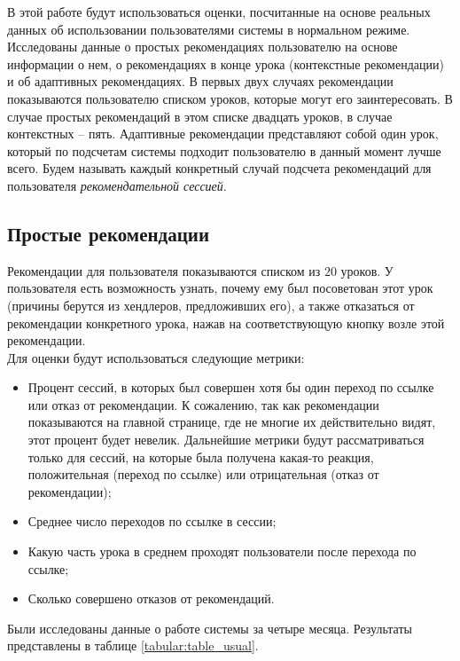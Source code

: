 \documentclass[14pt]{matmex-diploma}
\begin{document}
\indent В этой работе будут использоваться оценки, посчитанные на основе реальных данных об использовании пользователями системы в нормальном режиме. Исследованы данные о простых рекомендациях пользователю на основе информации о нем, о рекомендациях в конце урока (контекстные рекомендации) и об адаптивных рекомендациях. 
\indent В первых двух случаях рекомендации показываются пользователю списком уроков, которые могут его заинтересовать. В случае простых рекомендаций в этом списке двадцать уроков, в случае контекстных -- пять. Адаптивные рекомендации представляют собой один урок, который по подсчетам системы подходит пользователю в данный момент лучше всего. Будем называть каждый конкретный случай подсчета рекомендаций для пользователя \textit{рекомендательной сессией}.

\subsection{Простые рекомендации}
\indent Рекомендации для пользователя показываются списком из $20$ уроков. У пользователя есть возможность узнать, почему ему был посоветован этот урок (причины берутся из хендлеров, предложивших его), а также отказаться от рекомендации конкретного урока, нажав на соответствующую кнопку возле этой рекомендации. 
\\\indent Для оценки будут использоваться следующие метрики:

\begin{itemize}
    \item Процент сессий, в которых был совершен хотя бы один переход по ссылке или отказ от рекомендации. К сожалению, так как рекомендации показываются на главной странице, где не многие их действительно видят, этот процент будет невелик. Дальнейшие метрики будут рассматриваться только для сессий, на которые была получена какая-то реакция, положительная (переход по ссылке) или отрицательная (отказ от рекомендации);
    \item Среднее число переходов по ссылке в сессии;
    \item Какую часть урока в среднем проходят пользователи после перехода по ссылке;
    \item Сколько совершено отказов от рекомендаций.
\end{itemize}

\indent Были исследованы данные о работе системы за четыре месяца. Результаты представлены в таблице \ref{tabular:table_usual}.
\end{document}
